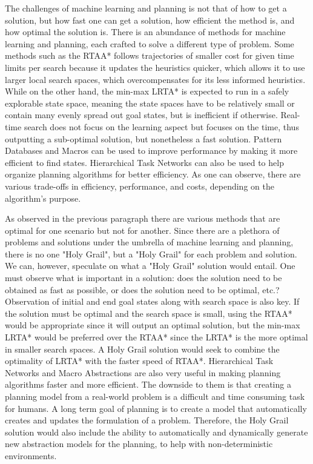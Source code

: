 \documentclass[tog]{acmsiggraph}
\begin{document}
The challenges of machine learning and planning is not that of how to
get a solution, but how fast one can get a solution, how efficient the
method is, and how optimal the solution is. There is an abundance of
methods for machine learning and planning, each crafted to solve a
different type of problem. Some methods such as the RTAA* follows
trajectories of smaller cost for given time limits per search because
it updates the heuristics quicker, which allows it to use larger local
search spaces, which overcompensates for its less informed heuristics.
While on the other hand, the min-max LRTA* is expected to run in a
safely explorable state space, meaning the state spaces have to be
relatively small or contain many evenly spread out goal states, but is
inefficient if otherwise. Real-time search does not focus on the
learning aspect but focuses on the time, thus outputting a sub-optimal
solution, but nonetheless a fast solution. Pattern Databases and
Macros can be used to improve performance by making it more efficient
to find states. Hierarchical Task Networks can also be used to help
organize planning algorithms for better efficiency. As one can
observe, there are various trade-offs in efficiency, performance, and
costs, depending on the algorithm's purpose.

As observed in the previous paragraph there are various methods that
are optimal for one scenario but not for another. Since there are a
plethora of problems and solutions under the umbrella of machine
learning and planning, there is no one "Holy Grail", but a "Holy
Grail" for each problem and solution. We can, however, speculate on
what a "Holy Grail" solution would entail. One must observe what is
important in a solution: does the solution need to be obtained as fast
as possible, or does the solution need to be optimal, etc.?
Observation of initial and end goal states along with search space is
also key. If the solution must be optimal and the search space is
small, using the RTAA* would be appropriate since it will output an
optimal solution, but the min-max LRTA* would be preferred over the
RTAA* since the LRTA* is the more optimal in smaller search spaces. A
Holy Grail solution would seek to combine the optimality of LRTA* with
the faster speed of RTAA*. Hierarchical Task Networks and Macro
Abstractions are also very useful in making planning algorithms faster
and more efficient. The downside to them is that creating a planning
model from a real-world problem is a difficult and time consuming task
for humans. A long term goal of planning is to create a model that
automatically creates and updates the formulation of a problem.
Therefore, the Holy Grail solution would also include the ability to
automatically and dynamically generate new abstraction models for the
planning, to help with non-deterministic environments.
\end{document}
